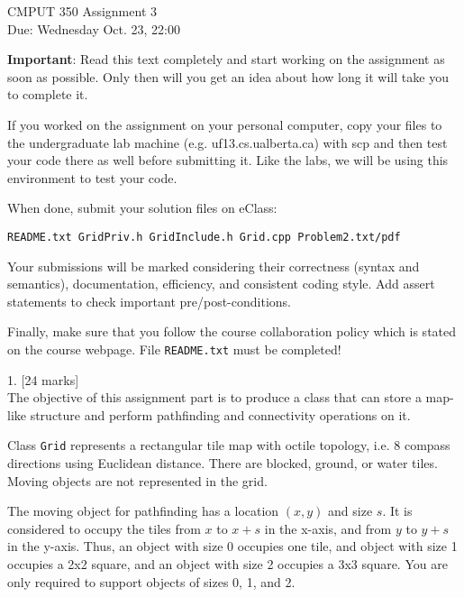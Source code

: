 \documentclass[a4paper,11pt]{article}
\begin{document}

\begin{center}
{\Large CMPUT 350 Assignment 3} \\
{Due: Wednesday Oct. 23, 22:00}
\end{center}

\linerule

\textbf{Important}:
Read this text completely and start working on the assignment as
soon as possible. Only then will you get an idea about how long it will take
you to complete it. 

\medskip

If you worked on the assignment on your personal computer, copy your files to
the undergraduate lab machine (e.g. uf13.cs.ualberta.ca) with
scp and then test your code there as well before submitting it. 
Like the labs, we will be using this environment to test your code.

\medskip

When done, submit your solution files on eClass:

\begin{center}
    \texttt{README.txt GridPriv.h GridInclude.h Grid.cpp Problem2.txt/pdf}
\end{center}


\bigskip 

Your submissions will be marked considering their correctness (syntax and
semantics), documentation, efficiency, and consistent coding style. Add assert
statements to check important pre/post-conditions.

\medskip

Finally, make sure that you follow the course collaboration policy which is
stated on the course webpage. File \texttt{README.txt} must be completed!

\linerule

1. [24 marks] \\
The objective of this assignment part is to produce a class that can store a
map-like structure and perform pathfinding and connectivity operations on it.

\bigskip

Class \texttt{Grid} represents a rectangular tile map with octile topology, i.e. 8
compass directions using Euclidean distance. There are blocked, ground, or
water tiles. Moving objects are not represented in the grid.

\bigskip

The moving object for pathfinding has a location $(x,y)$ and size $s$. It is
considered to occupy the tiles from $x$ to $x+s$ in the x-axis, and from $y$ to $y+s$
in the y-axis. Thus, an object with size 0 occupies one tile, and object with
size 1 occupies a 2x2 square, and an object with size 2 occupies a 3x3
square. You are only required to support objects of sizes 0, 1, and 2.
\end{document}
